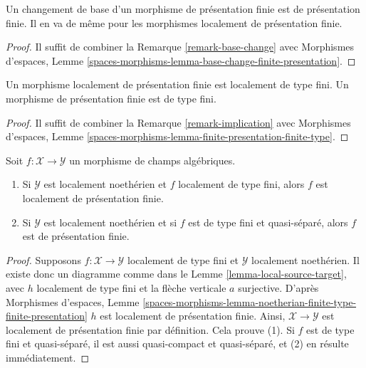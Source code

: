 \begin{lemma}
\label{lemma-base-change-finite-presentation}
Un changement de base d'un morphisme de présentation finie est de présentation
finie. Il en va de même pour les morphismes localement de présentation finie.
\end{lemma}

\begin{proof}
Il suffit de combiner la Remarque \ref{remark-base-change} avec Morphismes
d'espaces, Lemme
\ref{spaces-morphisms-lemma-base-change-finite-presentation}.
\end{proof}

\begin{lemma}
\label{lemma-finite-presentation-finite-type}
Un morphisme localement de présentation finie est localement de type fini.
Un morphisme de présentation finie est de type fini.
\end{lemma}

\begin{proof}
Il suffit de combiner la Remarque \ref{remark-implication} avec Morphismes
d'espaces, Lemme
\ref{spaces-morphisms-lemma-finite-presentation-finite-type}.
\end{proof}

\begin{lemma}
\label{lemma-noetherian-finite-type-finite-presentation}
Soit $f : \mathcal{X} \to \mathcal{Y}$ un morphisme de champs algébriques.
\begin{enumerate}
\item Si $\mathcal{Y}$ est localement noethérien et $f$ localement de type
fini, alors $f$ est localement de présentation finie.
\item Si $\mathcal{Y}$ est localement noethérien et si $f$ est de type fini
et quasi-séparé, alors $f$ est de présentation finie.
\end{enumerate}
\end{lemma}

\begin{proof}
Supposons $f : \mathcal{X} \to \mathcal{Y}$ localement de type fini et
$\mathcal{Y}$ localement noethérien. Il existe donc un diagramme comme dans le
Lemme \ref{lemma-local-source-target}, avec $h$ localement de type fini et la
flèche verticale $a$ surjective. D'après Morphismes d'espaces, Lemme
\ref{spaces-morphisms-lemma-noetherian-finite-type-finite-presentation}
$h$ est localement de présentation finie. Ainsi,
$\mathcal{X} \to \mathcal{Y}$ est localement de présentation finie par
définition. Cela prouve (1). Si $f$ est de type fini et quasi-séparé, il est
aussi quasi-compact et quasi-séparé, et (2) en résulte immédiatement.
\end{proof}

